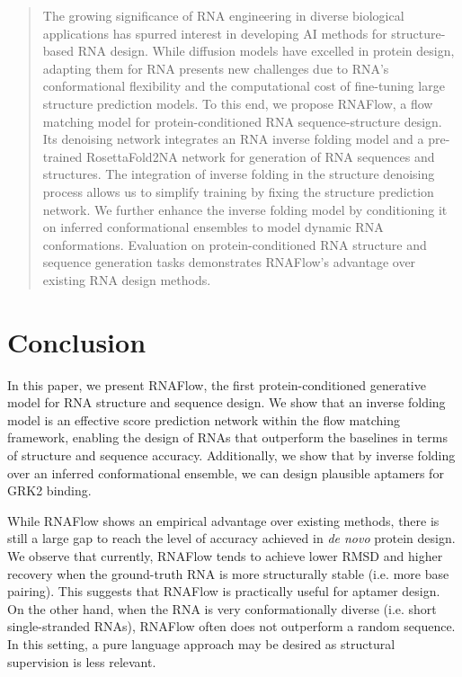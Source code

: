 \documentclass{article}
\theoremstyle{plain}
\theoremstyle{definition}
\theoremstyle{remark}
\begin{document}
\begin{abstract}
The growing significance of RNA engineering in diverse biological applications has spurred interest in developing AI methods for structure-based RNA design. While diffusion models have excelled in protein design, adapting them for RNA presents new challenges due to RNA's conformational flexibility and the computational cost of fine-tuning large structure prediction models. To this end, we propose RNAFlow, a flow matching model for protein-conditioned RNA sequence-structure design. Its denoising network integrates an RNA inverse folding model and a pre-trained RosettaFold2NA network for generation of RNA sequences and structures. The integration of inverse folding in the structure denoising process allows us to simplify training by fixing the structure prediction network. We further enhance the inverse folding model by conditioning it on inferred conformational ensembles to model dynamic RNA conformations. Evaluation on protein-conditioned RNA structure and sequence generation tasks demonstrates RNAFlow's advantage over existing RNA design methods.
\end{abstract}









\section{Conclusion}

In this paper, we present RNAFlow, the first protein-conditioned generative model for RNA structure and sequence design. We show that an inverse folding model is an effective score prediction network within the flow matching framework, enabling the design of RNAs that outperform the baselines in terms of structure and sequence accuracy. Additionally, we show that by inverse folding over an inferred conformational ensemble, we can design plausible aptamers for GRK2 binding.

While RNAFlow shows an empirical advantage over existing methods, there is still a large gap to reach the level of accuracy achieved in \textit{de novo} protein design. We observe that currently, RNAFlow tends to achieve lower RMSD and higher recovery when the ground-truth RNA is more structurally stable (i.e. more base pairing). This suggests that RNAFlow is practically useful for aptamer design. On the other hand, when the RNA is very conformationally diverse (i.e. short single-stranded RNAs), RNAFlow often does not outperform a random sequence. In this setting, a pure language approach may be desired as structural supervision is less relevant.
\end{document}
